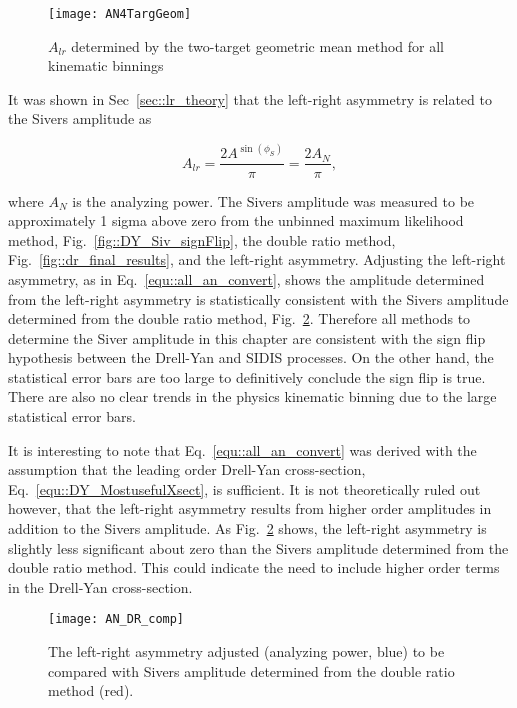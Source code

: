 \begin{figure}[h!t]
  \begin{center}
    \texttt{[image: AN4TargGeom]}
    \caption{$A_{lr}$ determined by the two-target geometric mean method
      for all kinematic binnings}
    \label{fig::AN4TargGeom}
  \end{center}
\end{figure}

It was shown in Sec~\ref{sec::lr_theory} that the left-right asymmetry is
related to the Sivers amplitude as

\begin{equation}
  \label{equ::all_an_convert}
  A_{lr} = \frac{2A^{\sin(\phi_S)}}{\pi} = \frac{2A_N}{\pi},
\end{equation}

\noindent
where $A_N$ is the analyzing power.  The Sivers amplitude was measured to be
approximately 1 sigma above zero from the unbinned maximum likelihood method,
Fig.~\ref{fig::DY_Siv_signFlip}, the double ratio method,
Fig.~\ref{fig::dr_final_results}, and the left-right asymmetry.  Adjusting the
left-right asymmetry, as in Eq.~\ref{equ::all_an_convert}, shows the amplitude
determined from the left-right asymmetry is statistically consistent with the
Sivers amplitude determined from the double ratio method,
Fig.~\ref{fig::AN_DR_comp}.  Therefore all methods to determine the Siver
amplitude in this chapter are consistent with the sign flip hypothesis between
the Drell-Yan and SIDIS processes.  On the other hand, the statistical error
bars are too large to definitively conclude the sign flip is true.  There are
also no clear trends in the physics kinematic binning due to the large
statistical error bars.

It is interesting to note that Eq.~\ref{equ::all_an_convert} was derived with
the assumption that the leading order Drell-Yan cross-section,
Eq.~\ref{equ::DY_MostusefulXsect}, is sufficient.  It is not theoretically ruled
out however, that the left-right asymmetry results from higher order amplitudes
in addition to the Sivers amplitude.  As Fig.~\ref{fig::AN_DR_comp} shows, the
left-right asymmetry is slightly less significant about zero than the Sivers
amplitude determined from the double ratio method.  This could indicate the need
to include higher order terms in the Drell-Yan cross-section.

\begin{figure}[h!t]
  \centering \texttt{[image: AN\_DR\_comp]}
  \caption{The left-right asymmetry adjusted (analyzing power, blue) to be
    compared with Sivers amplitude determined from the double ratio method
    (red).}
  \label{fig::AN_DR_comp}
\end{figure}


